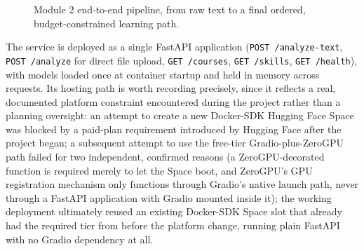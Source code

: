 \documentclass[11pt,a4paper]{article}
\newcommand{\code}[1]{\texttt{\footnotesize #1}}
\begin{document}
\begin{figure}[H]
\centering
{}
\caption{Module 2 end-to-end pipeline, from raw text to a final ordered, budget-constrained learning path.}
\label{fig:mod2-pipeline}
\end{figure}

The service is deployed as a single FastAPI application (\code{POST /analyze-text}, \code{POST /analyze} for direct file upload, \code{GET /courses}, \code{GET /skills}, \code{GET /health}), with models loaded once at container startup and held in memory across requests. Its hosting path is worth recording precisely, since it reflects a real, documented platform constraint encountered during the project rather than a planning oversight: an attempt to create a new Docker-SDK Hugging Face Space was blocked by a paid-plan requirement introduced by Hugging Face after the project began; a subsequent attempt to use the free-tier Gradio-plus-ZeroGPU path failed for two independent, confirmed reasons (a ZeroGPU-decorated function is required merely to let the Space boot, and ZeroGPU's GPU registration mechanism only functions through Gradio's native launch path, never through a FastAPI application with Gradio mounted inside it); the working deployment ultimately reused an existing Docker-SDK Space slot that already had the required tier from before the platform change, running plain FastAPI with no Gradio dependency at all.

\clearpage
\end{document}
